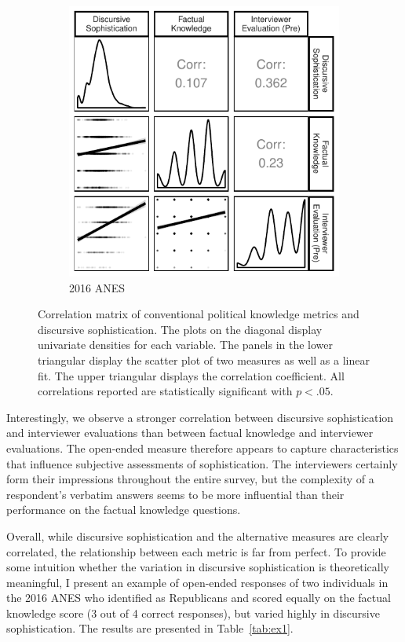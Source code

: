 \documentclass[12pt]{article}
\begin{document}
\begin{figure}[h]
\begin{subfigure}[t]{0.5\textwidth}
        \includegraphics{../fig/corplot_pres2016.pdf}
        \caption{2016 ANES}
    \end{subfigure}
    \caption{Correlation matrix of conventional political knowledge metrics and discursive sophistication. The plots on the diagonal display univariate densities for each variable. The panels in the lower triangular display the scatter plot of two measures as well as a linear fit. The upper triangular displays the correlation coefficient. All correlations reported are statistically significant with $p<.05$.}\label{fig:corplot}
\end{figure}

Interestingly, we observe a stronger correlation between discursive sophistication and interviewer evaluations than between factual knowledge and interviewer evaluations. The open-ended measure therefore appears to capture characteristics that influence subjective assessments of sophistication. The interviewers certainly form their impressions throughout the entire survey, but the complexity of a respondent's verbatim answers seems to be more influential than their performance on the factual knowledge questions.

Overall, while discursive sophistication and the alternative measures are clearly correlated, the relationship between each metric is far from perfect. To provide some intuition whether the variation in discursive sophistication is theoretically meaningful, I present an example of open-ended responses of two individuals in the 2016 ANES who identified as Republicans and scored equally on the factual knowledge score (3 out of 4 correct responses), but varied highly in discursive sophistication. The results are presented in Table~\ref{tab:ex1}.
\end{document}
